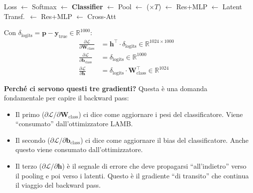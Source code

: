 \documentclass[12pt,a4paper]{article}
\begin{document}
\begin{pipelinebox}[title={\small Backward --- Passo corrente evidenziato}]
Loss $\leftarrow$ Softmax $\leftarrow$ \textbf{Classifier} $\leftarrow$ Pool $\leftarrow$ ($\times T$) $\leftarrow$ Res+MLP $\leftarrow$ Latent Transf.\ $\leftarrow$ Res+MLP $\leftarrow$ Cross-Att
\end{pipelinebox}

\begin{formulabox}
Con $\delta_{\text{logits}} = \mathbf{p} - \mathbf{y}_{\text{true}} \in \mathbb{R}^{1000}$:
\begin{align*}
    \frac{\partial \mathcal{L}}{\partial \mathbf{W}_{\text{class}}} &= \mathbf{h}^\top \cdot \delta_{\text{logits}} \in \mathbb{R}^{1024 \times 1000} \\
    \frac{\partial \mathcal{L}}{\partial \mathbf{b}_{\text{class}}} &= \delta_{\text{logits}} \in \mathbb{R}^{1000} \\
    \frac{\partial \mathcal{L}}{\partial \mathbf{h}} &= \delta_{\text{logits}} \cdot \mathbf{W}_{\text{class}}^\top \in \mathbb{R}^{1024}
\end{align*}
\end{formulabox}

\textbf{Perch\'e ci servono questi tre gradienti?} Questa \`e una domanda fondamentale per capire il backward pass:
\begin{itemize}
    \item Il primo ($\partial \mathcal{L} / \partial \mathbf{W}_{\text{class}}$) ci dice come aggiornare i pesi del classificatore. Viene ``consumato'' dall'ottimizzatore LAMB.
    \item Il secondo ($\partial \mathcal{L} / \partial \mathbf{b}_{\text{class}}$) ci dice come aggiornare il bias del classificatore. Anche questo viene consumato dall'ottimizzatore.
    \item Il terzo ($\partial \mathcal{L} / \partial \mathbf{h}$) \`e il segnale di errore che deve propagarsi ``all'indietro'' verso il pooling e poi verso i latenti. Questo \`e il gradiente ``di transito'' che continua il viaggio del backward pass.
\end{itemize}
\end{document}
